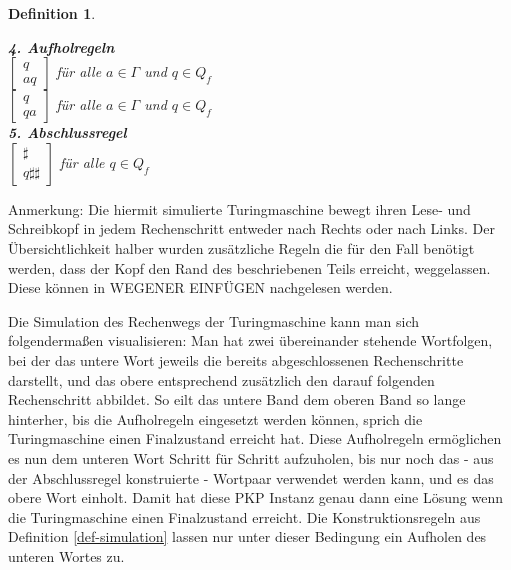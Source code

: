 \documentclass[]{scrartcl}
\newtheorem{definition}{Definition}[section]
\begin{document}
\begin{definition}
\begin{tabbing}
						\textbf{4. Aufholregeln}\\
							\> \textbullet$\begin{bmatrix} q \\ aq \end{bmatrix}$ \> für alle $a \in \varGamma$ und $q \in Q_f$\\
							\> \textbullet$\begin{bmatrix} q \\ qa \end{bmatrix}$ \> für alle $a \in \varGamma$ und $q \in Q_f$\\
						\textbf{5. Abschlussregel}\\
							\> \textbullet$\begin{bmatrix} \sharp \\ q\sharp\sharp\end{bmatrix}$ \> für alle $q \in Q_f$

				\end{tabbing} 
			\end{definition}
			Anmerkung: Die hiermit simulierte Turingmaschine bewegt ihren Lese- und Schreibkopf in jedem Rechenschritt entweder nach Rechts oder nach Links. Der Übersichtlichkeit halber wurden zusätzliche Regeln die für den Fall benötigt werden, dass der Kopf den Rand des beschriebenen Teils erreicht, weggelassen. Diese können in WEGENER EINFÜGEN nachgelesen werden.
			
			Die Simulation des Rechenwegs der Turingmaschine kann man sich folgendermaßen visualisieren: Man hat zwei übereinander stehende Wortfolgen, bei der das untere Wort jeweils die bereits abgeschlossenen Rechenschritte darstellt, und das obere entsprechend zusätzlich den darauf folgenden Rechenschritt abbildet. So eilt das untere Band dem oberen Band so lange hinterher, bis die Aufholregeln eingesetzt werden können, sprich die Turingmaschine einen Finalzustand erreicht hat. Diese Aufholregeln ermöglichen es nun dem unteren Wort Schritt für Schritt aufzuholen, bis nur noch das - aus der Abschlussregel konstruierte - Wortpaar verwendet werden kann, und es das obere Wort einholt. Damit hat diese PKP Instanz genau dann eine Lösung wenn die Turingmaschine einen Finalzustand erreicht. Die Konstruktionsregeln aus Definition \ref{def-simulation} lassen nur unter dieser Bedingung ein Aufholen des unteren Wortes zu.
			
\end{document}
